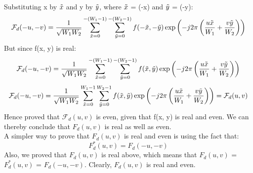 \documentclass{article}
\begin{document}
\begin{enumerate}
Substituting x by $\Tilde{x}$ and y by $\Tilde{y}$, where $\Tilde{x}$ = (-x) and $\Tilde{y}$ = (-y):
\begin{equation}
    \mathcal{F}_d(-u, -v) = \frac{1}{\sqrt{W_1 W_2}} \sum_{\Tilde{x}=0}^{-(W_1-1)} \sum_{\Tilde{y}=0}^{-(W_2-1)} f(-\Tilde{x}, -\Tilde{y}) \exp \left(-j 2 \pi \left( \frac{u\Tilde{x}}{W_1} + \frac{v\Tilde{y}}{W_2} \right) \right)
\end{equation}
But since f(x, y) is real:
\begin{equation}
    \mathcal{F}_d(-u, -v) = \frac{1}{\sqrt{W_1 W_2}} \sum_{\Tilde{x}=0}^{-(W_1-1)} \sum_{\Tilde{y}=0}^{-(W_2-1)} f(\Tilde{x}, \Tilde{y}) \exp \left(-j 2 \pi \left( \frac{u\Tilde{x}}{W_1} + \frac{v\Tilde{y}}{W_2} \right) \right)
\end{equation}
\begin{equation}
    \mathcal{F}_d(-u, -v) = \frac{1}{\sqrt{W_1 W_2}} \sum_{\Tilde{x}=0}^{W_1-1} \sum_{\Tilde{y}=0}^{W_2-1} f(\Tilde{x}, \Tilde{y}) \exp \left(-j 2 \pi \left( \frac{u\Tilde{x}}{W_1} + \frac{v\Tilde{y}}{W_2} \right) \right) = \mathcal{F}_d(u, v)
\end{equation}
Hence proved that $\mathcal{F}_d(u, v)$ is even, given that f(x, y) is real and even. We can thereby conclude that \(F_d(u, v)\) is real as well as even.\\
\noindent A simpler way to prove that \(F_d(u, v)\) is real and even is using the fact that:
\begin{equation}
    F_d^*(u, v) = F_d(-u, -v)
\end{equation}
Also, we proved that \(F_d(u, v)\) is real above, which means that \(F_d(u, v)\) = \(F_d^*(u, v)\) = \(F_d(-u, -v)\). Clearly, \(F_d(u, v)\) is real and even.
\end{enumerate}
\end{document}
